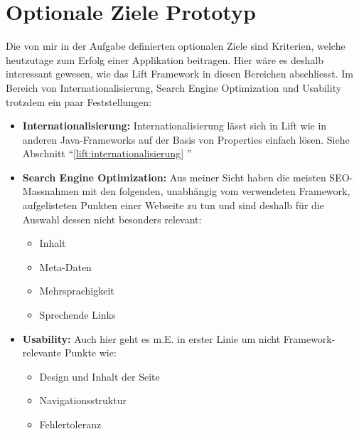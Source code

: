 \section{Optionale Ziele Prototyp}
Die von mir in der Aufgabe definierten optionalen Ziele sind Kriterien, welche heutzutage zum Erfolg einer Applikation beitragen. Hier w\"are es deshalb interessant gewesen, wie das Lift Framework in diesen Bereichen abschliesst. Im Bereich von Internationalisierung, Search Engine Optimization und Usability trotzdem ein paar Feststellungen:
\begin{itemize}
\item  \textbf{Internationalisierung: } Internationalisierung l\"asst sich in Lift wie in anderen Java-Frameworks auf der Basis von Properties einfach l\"osen. Siehe Abschnitt ``\ref{lift:internationalisierung} ''
\item \textbf{Search Engine Optimization: }Aus meiner Sicht haben die meisten SEO-Massnahmen mit den folgenden, unabh\"angig vom verwendeten Framework, aufgelisteten Punkten einer Webseite zu tun und sind deshalb f\"ur die Auswahl dessen nicht besonders relevant:
\begin{itemize}
\item Inhalt
\item Meta-Daten
\item Mehrsprachigkeit
\item Sprechende Links
\end{itemize}
\item \textbf{Usability: } Auch hier geht es m.E. in erster Linie um nicht Framework-relevante Punkte wie:
\begin{itemize}
\item Design und Inhalt der Seite
\item Navigationsstruktur
\item Fehlertoleranz
\end{itemize}
\end{itemize}


